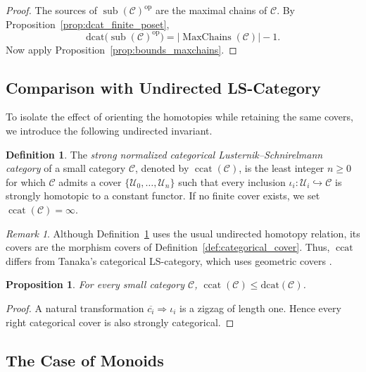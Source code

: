 \documentclass[12pt]{amsart}
\newtheorem{prop}[teo]{Proposition}
\theoremstyle{definition}
\newtheorem{definition}[teo]{Definition}
\theoremstyle{remark}
\newtheorem{remark}{Remark}
\numberwithin{figure}{section}%
\newcommand{\CC}{\mathcal{C}}
\newcommand{\ccat}{\mathop{\mathrm{ccat}}}
\newcommand{\op}{\mathrm{op}}
\newcommand{\Uc}{\mathcal{U}}
\begin{document}
\begin{proof}
The sources of \(\operatorname{sub}(\CC)^{\op}\) are the maximal chains of
\(\CC\). By Proposition~\ref{prop:dcat_finite_poset},
\[
\mathrm{dcat}\bigl(\operatorname{sub}(\CC)^{\op}\bigr)
=
|\operatorname{MaxChains}(\CC)|-1.
\]
Now apply Proposition~\ref{prop:bounds_maxchains}.
\end{proof}

\subsection{Comparison with Undirected LS-Category}

To isolate the effect of orienting the homotopies while retaining the same
covers, we introduce the following undirected invariant.

\begin{definition}\label{def:strong_ccat}
The \emph{strong normalized categorical Lusternik--Schnirelmann category}
of a small category \(\CC\), denoted by \(\ccat(\CC)\), is the least
integer \(n\geq0\) for which \(\CC\) admits a cover
\(\{\Uc_0,\ldots,\Uc_n\}\) such that every inclusion
\(\iota_i\colon\Uc_i\hookrightarrow\CC\) is strongly homotopic to a
constant functor. If no finite cover exists, we set
\(\ccat(\CC)=\infty\).
\end{definition}

\begin{remark}
Although Definition~\ref{def:strong_ccat} uses the usual undirected
homotopy relation, its covers are the morphism covers of
Definition~\ref{def:categorical_cover}. Thus, \(\ccat\) differs from
Tanaka's categorical LS-category, which uses geometric covers
\cite{LS-Tanaka}.
\end{remark}

\begin{prop}\label{prop:ccat_leq_dcat}
For every small category \(\CC\),
\(\ccat(\CC)\leq\mathrm{dcat}(\CC)\).
\end{prop}

\begin{proof}
A natural transformation
\(\overline{c_i}\Rightarrow\iota_i\) is a zigzag of length one. Hence every
right categorical cover is also strongly categorical.
\end{proof}

\subsection{The Case of Monoids}
\label{subsec:dcat_monoids}
\end{document}

